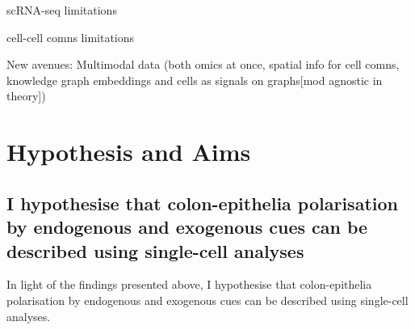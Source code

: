 scRNA-seq limitations

cell-cell comns limitations 

New avenues:
Multimodal data (both omics at once, spatial info for cell comns, knowledge graph embeddings and cells as signals on graphs[mod agnostic in theory])





\section{Hypothesis and Aims}

\subsection{I hypothesise that colon-epithelia polarisation by endogenous and exogenous cues can be described using single-cell analyses}

In light of the findings presented above, I hypothesise that colon-epithelia polarisation by endogenous and exogenous cues can be described using single-cell analyses.


